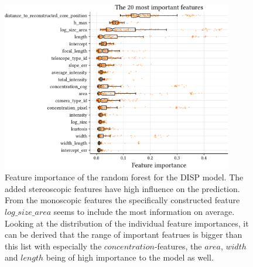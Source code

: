 \begin{figure}
	\centering
    \captionsetup{width=0.9\linewidth}
	\includegraphics[width=0.9\textwidth]{../analysis/plots/disp_features.pdf}
	\caption{
	    Feature importance of the random forest for the DISP model.
	    The added stereoscopic features have high influence on the prediction.
    	From the monoscopic features the specifically constructed feature
    	$log\_size\_area$ seems to include the most information on average.
        Looking at the distribution of the individual feature importances, it 
        can be derived that the range of important featrues is bigger than this list
        with especially the $concentration$-features, the $area$, $width$ and $length$
        being of high importance to the model as well.}
	\label{fig:disp_features}
\end{figure}

